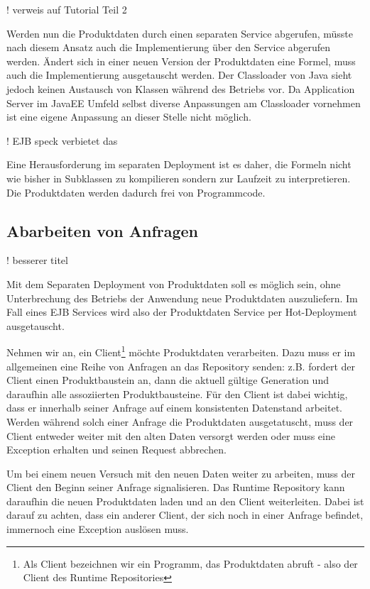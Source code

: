 \documentclass[headsepline=true, footsepline=true]{scrartcl}
\begin{document}
! verweis auf Tutorial Teil 2

Werden nun die Produktdaten durch einen separaten Service abgerufen, müsste nach
diesem Ansatz auch die Implementierung über den Service abgerufen werden. Ändert
sich in einer neuen Version der Produktdaten eine Formel, muss auch die
Implementierung ausgetauscht werden. Der Classloader von Java sieht jedoch keinen
Austausch von Klassen während des Betriebs vor. Da Application Server im JavaEE
Umfeld selbst diverse Anpassungen am Classloader vornehmen ist eine eigene
Anpassung an dieser Stelle nicht möglich.

! EJB speck verbietet das

Eine Herausforderung im separaten Deployment ist es daher, die Formeln nicht wie
bisher in Subklassen zu kompilieren sondern zur Laufzeit zu interpretieren. Die
Produktdaten werden dadurch frei von Programmcode.

\subsection{Abarbeiten von Anfragen}
! besserer titel
\label{requests}

Mit dem Separaten Deployment von Produktdaten soll es möglich sein, ohne
Unterbrechung des Betriebs der Anwendung neue Produktdaten auszuliefern. Im Fall
eines EJB Services wird also der Produktdaten Service per Hot-Deployment
ausgetauscht.

Nehmen wir an, ein Client\footnote{Als Client bezeichnen wir ein Programm, das
Produktdaten abruft - also der Client des Runtime Repositories} möchte
Produktdaten verarbeiten. Dazu muss er im allgemeinen eine Reihe von Anfragen an
das Repository senden: z.B. fordert der Client einen Produktbaustein an, dann die
aktuell gültige Generation und daraufhin alle assoziierten Produktbausteine. Für
den Client ist dabei wichtig, dass er innerhalb seiner Anfrage auf einem
konsistenten Datenstand arbeitet. Werden während solch einer Anfrage die
Produktdaten ausgetatuscht, muss der Client entweder weiter mit den alten Daten
versorgt werden oder muss eine Exception erhalten und seinen Request abbrechen.

Um bei einem neuen Versuch mit den neuen Daten weiter zu arbeiten, muss der
Client den Beginn seiner Anfrage signalisieren. Das Runtime Repository kann
daraufhin die neuen Produktdaten laden und an den Client weiterleiten. Dabei ist
darauf zu achten, dass ein anderer Client, der sich noch in einer Anfrage
befindet, immernoch eine Exception auslösen muss.
\end{document}
